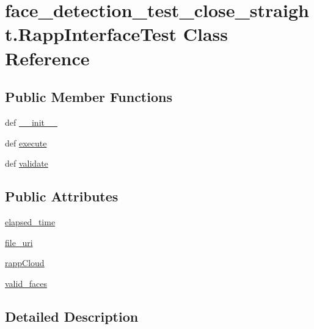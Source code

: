 \hypertarget{classface__detection__test__close__straight_1_1RappInterfaceTest}{\section{face\-\_\-detection\-\_\-test\-\_\-close\-\_\-straight.\-Rapp\-Interface\-Test Class Reference}
\label{classface__detection__test__close__straight_1_1RappInterfaceTest}
}
\subsection*{Public Member Functions}
\begin{DoxyCompactItemize}
\item 
def \hyperlink{classface__detection__test__close__straight_1_1RappInterfaceTest_a4cd99cac840302149a77e7181c072cce}{\-\_\-\-\_\-init\-\_\-\-\_\-}
\item 
def \hyperlink{classface__detection__test__close__straight_1_1RappInterfaceTest_a3df1daf5cd1085f8ff03a83806450bb6}{execute}
\item 
def \hyperlink{classface__detection__test__close__straight_1_1RappInterfaceTest_a1ff29a66caa8320facbd6b3446443f34}{validate}
\end{DoxyCompactItemize}
\subsection*{Public Attributes}
\begin{DoxyCompactItemize}
\item 
\hyperlink{classface__detection__test__close__straight_1_1RappInterfaceTest_a8def9990bb3f1d2cfa4537e796bf9b41}{elapsed\-\_\-time}
\item 
\hyperlink{classface__detection__test__close__straight_1_1RappInterfaceTest_a74e2fa12bb9e8bc10125b88a0c145cc5}{file\-\_\-uri}
\item 
\hyperlink{classface__detection__test__close__straight_1_1RappInterfaceTest_ac65b7031e0d862badc74b38509e26d76}{rapp\-Cloud}
\item 
\hyperlink{classface__detection__test__close__straight_1_1RappInterfaceTest_ab934cbe6e83144f16e047707165e2f3c}{valid\-\_\-faces}
\end{DoxyCompactItemize}


\subsection{Detailed Description}


